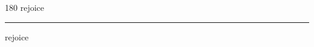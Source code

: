 
\begin{frame}
\begin{center}
\begin{turn}{180}
{\fontsize{2.5cm}{1em}\selectfont rejoice}
\end{turn}
\vspace{1em}\par  
\hrule
\vspace{1em}\par  
{\fontsize{2.5cm}{1em}\selectfont rejoice}
\end{center}
\end{frame}
